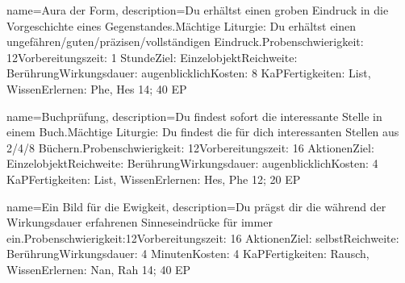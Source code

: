 {
    name={Aura der Form},
    description={Du erhältst einen groben Eindruck in die Vorgeschichte eines Gegenstandes.\newline Mächtige Liturgie: Du erhältst einen ungefähren/guten/präzisen/vollständigen Eindruck.\newline Probenschwierigkeit: 12\newline Vorbereitungszeit: 1 Stunde\newline Ziel: Einzelobjekt\newline Reichweite: Berührung\newline Wirkungsdauer: augenblicklich\newline Kosten: 8 KaP\newline Fertigkeiten: List, Wissen\newline Erlernen: Phe, Hes 14; 40 EP}
}


{
    name={Buchprüfung},
    description={Du findest sofort die interessante Stelle in einem Buch.\newline Mächtige Liturgie: Du findest die für dich interessanten Stellen aus 2/4/8 Büchern.\newline Probenschwierigkeit: 12\newline Vorbereitungszeit: 16 Aktionen\newline Ziel: Einzelobjekt\newline Reichweite: Berührung\newline Wirkungsdauer: augenblicklich\newline Kosten: 4 KaP\newline Fertigkeiten: List, Wissen\newline Erlernen: Hes, Phe 12; 20 EP}
}


{
    name={Ein Bild für die Ewigkeit},
    description={Du prägst dir die während der Wirkungsdauer erfahrenen Sinneseindrücke für immer ein.\newline Probenschwierigkeit:12\newline Vorbereitungszeit: 16 Aktionen\newline Ziel: selbst\newline Reichweite: Berührung\newline Wirkungsdauer: 4 Minuten\newline Kosten: 4 KaP\newline Fertigkeiten: Rausch, Wissen\newline Erlernen: Nan, Rah 14; 40 EP}
}


